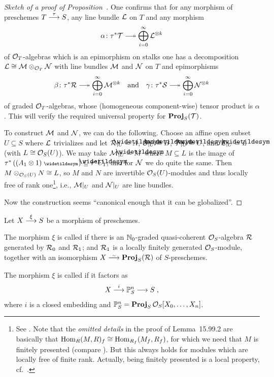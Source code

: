 \documentclass[a4paper,parskip=half,numbers=enddot, DIV=12]{scrreprt}
\begin{document}
\begin{proof}[Sketch of a proof of Proposition~]
	One confirms that for any morphism of preschemes $T\morphism[\tau]S$, any line bundle $\mathcal{L}$ on $T$ and any morphism
	\begin{align*}
		\alpha\colon \tau^*\Tt\epimorphism\bigoplus_{i=0}^\infty\Ll^{\otimes k}
	\end{align*}
	of $\mathcal{O}_T$-algebras which is an epimorphism on stalks one has a decomposition $\mathcal{L}\cong\mathcal{M}\otimes_{\mathcal{O}_T}\mathcal{N}$ with line bundles $\mathcal{M}$ and $\mathcal{N}$ on $T$ and epimorphisms 
	\begin{align*}
		\beta\colon \tau^*\Rr\epimorphism\bigoplus_{i=0}^{\infty}\Mm^{\otimes k}\quad\text{and}\quad\gamma\colon\tau^*\Ss\epimorphism\bigoplus_{i=0}^{\infty}\Nn^{\otimes k}
	\end{align*}
	of graded $\mathcal{O}_T$-algebras, whose (homogeneous component-wise) tensor product is $\alpha$. This will verify the required universal property for $\operatorname{\mathbf{Proj}}_S(\mathcal{T})$. 
	
	To construct $\mathcal{M}$ and $\mathcal{N}$, we can do the following. Choose an affine open subset $U\subseteq S$ where $\mathcal{L}$ trivializes and let $\Rr|_U=\snake{A}$, $\Ss|_U=\snake{B}$, $\Tt|_U=\snake{C}$, and $\Ll|_U=\snake{L}$ (with $L\cong \mathcal{O}_S(U)$). We may take $\Mm|_U=\snake{M}$ where $M\subseteq L$ is the image of $\tau^*\left((A_1\otimes 1)^\qcmod\right)\subseteq \tau^*\snake{C_1}$; and for $\mathcal{N}$ we do quite the same. Then $M\otimes_{\mathcal{O}_S(U)}N\cong L$, so $M$ and $N$ are invertible $\mathcal{O}_S(U)$-modules and thus locally free of rank one\footnote{See \cite[]{stacks-project}. Note that the \emph{omitted details} in the proof of Lemma~15.99.2 are basically that $\operatorname{Hom}_R(M,R)_f\cong \operatorname{Hom}_{R_f}(M_f,R_f)$, for which we need that $M$ is finitely presented (compare \cite[p.~9]{homalg}). But this always holds for modules which are locally free of finite rank. Actually, being finitely presented is a local property, cf.\ \cite[]{stacks-project}.}, i.e., $\mathcal{M}|_U$ and $\mathcal{N}|_U$ are line bundles.
	
	Now the construction seems ``canonical enough that it can be globalized''.
\end{proof}
\begin{defi}
	Let $X\morphism[\xi]S$  be a morphism of preschemes.
	\begin{alphanumerate}
		\item The morphism $\xi$ is called  if there is an $\mathbb{N}_0$-graded quasi-coherent $\mathcal{O}_S$-algebra $\mathcal{R}$ generated by $\mathcal{R}_0$ and $\mathcal{R}_1$; and $\mathcal{R}_1$ is a locally finitely generated $\mathcal{O}_S$-module, together with an isomorphism $X\isomorphism\PROJ_S(\Rr)$ of $S$-preschemes.
		\item The morphism $\xi$ is called  if it factors as
		\begin{align*}
			X\morphism[i]\IP_S^n\morphism S\;,
		\end{align*}
		where $i$ is a closed embedding and $\mathbb{P}_S^n=\operatorname{\mathbf{Proj}}_S\mathcal{O}_S[X_0,\ldots,X_n]$.
	\end{alphanumerate}
\end{defi}
\end{document}
